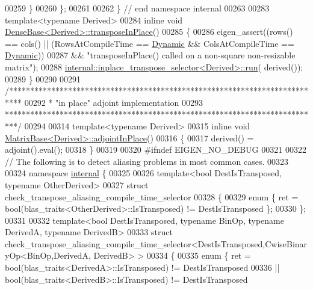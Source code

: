 \begin{DoxyCode}
00259   \}
00260 \};
00261 
00262 \} \textcolor{comment}{// end namespace internal}
00263 
00283 \textcolor{keyword}{template}<\textcolor{keyword}{typename} Derived>
00284 \textcolor{keyword}{inline} \textcolor{keywordtype}{void} \hyperlink{group___core___module_ac501bd942994af7a95d95bee7a16ad2a}{DenseBase<Derived>::transposeInPlace}()
00285 \{
00286   eigen\_assert((rows() == cols() || (RowsAtCompileTime == \hyperlink{namespace_eigen_ad81fa7195215a0ce30017dfac309f0b2}{Dynamic} && ColsAtCompileTime == 
      \hyperlink{namespace_eigen_ad81fa7195215a0ce30017dfac309f0b2}{Dynamic}))
00287                && \textcolor{stringliteral}{"transposeInPlace() called on a non-square non-resizable matrix"});
00288   \hyperlink{struct_eigen_1_1internal_1_1inplace__transpose__selector}{internal::inplace\_transpose\_selector<Derived>::run}(
      derived());
00289 \}
00290 
00291 \textcolor{comment}{/***************************************************************************}
00292 \textcolor{comment}{* "in place" adjoint implementation}
00293 \textcolor{comment}{***************************************************************************/}
00294 
00314 \textcolor{keyword}{template}<\textcolor{keyword}{typename} Derived>
00315 \textcolor{keyword}{inline} \textcolor{keywordtype}{void} \hyperlink{group___core___module_a51c5982c1f64e45a939515b701fa6f4a}{MatrixBase<Derived>::adjointInPlace}()
00316 \{
00317   derived() = adjoint().eval();
00318 \}
00319 
00320 \textcolor{preprocessor}{#ifndef EIGEN\_NO\_DEBUG}
00321 
00322 \textcolor{comment}{// The following is to detect aliasing problems in most common cases.}
00323 
00324 \textcolor{keyword}{namespace }\hyperlink{namespaceinternal}{internal} \{
00325 
00326 \textcolor{keyword}{template}<\textcolor{keywordtype}{bool} DestIsTransposed, \textcolor{keyword}{typename} OtherDerived>
00327 \textcolor{keyword}{struct }check\_transpose\_aliasing\_compile\_time\_selector
00328 \{
00329   \textcolor{keyword}{enum} \{ ret = bool(blas\_traits<OtherDerived>::IsTransposed) != DestIsTransposed \};
00330 \};
00331 
00332 \textcolor{keyword}{template}<\textcolor{keywordtype}{bool} DestIsTransposed, \textcolor{keyword}{typename} BinOp, \textcolor{keyword}{typename} DerivedA, \textcolor{keyword}{typename} DerivedB>
00333 \textcolor{keyword}{struct }check\_transpose\_aliasing\_compile\_time\_selector<DestIsTransposed,CwiseBinaryOp<BinOp,DerivedA,
      DerivedB> >
00334 \{
00335   \textcolor{keyword}{enum} \{ ret =    bool(blas\_traits<DerivedA>::IsTransposed) != DestIsTransposed
00336                || bool(blas\_traits<DerivedB>::IsTransposed) != DestIsTransposed

\end{DoxyCode}
